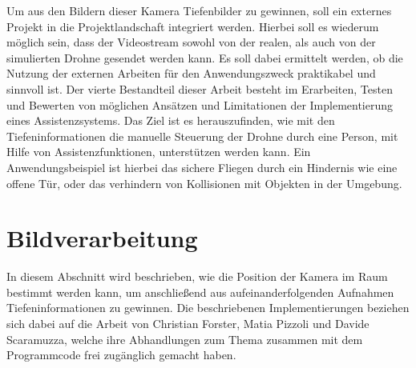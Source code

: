 Um aus den Bildern dieser Kamera Tiefenbilder zu gewinnen, soll ein externes Projekt in die Projektlandschaft integriert werden. Hierbei soll es wiederum möglich sein, dass der Videostream sowohl von der realen, als auch von der simulierten Drohne gesendet werden kann. Es soll dabei ermittelt werden, ob die Nutzung der externen Arbeiten für den Anwendungszweck praktikabel und sinnvoll ist. \newline
Der vierte Bestandteil dieser Arbeit besteht im Erarbeiten, Testen und Bewerten von möglichen Ansätzen und Limitationen der Implementierung eines Assistenzsystems. Das Ziel ist es herauszufinden, wie mit den Tiefeninformationen die manuelle Steuerung der Drohne durch eine Person, mit Hilfe von Assistenzfunktionen, unterstützen werden kann. \newline
Ein Anwendungsbeispiel ist hierbei das sichere Fliegen durch ein Hindernis wie eine offene Tür, oder das verhindern von Kollisionen mit Objekten in der Umgebung.
\newpage
\section{Bildverarbeitung}
\label{Bildverarbeitung}
In diesem Abschnitt wird beschrieben, wie die Position der Kamera im Raum bestimmt werden kann, um anschließend aus aufeinanderfolgenden Aufnahmen Tiefeninformationen zu gewinnen. Die beschriebenen Implementierungen beziehen sich dabei auf die Arbeit von Christian Forster, Matia Pizzoli und Davide Scaramuzza, welche ihre Abhandlungen zum Thema zusammen mit dem Programmcode frei zugänglich gemacht haben.

